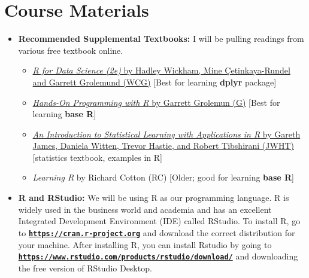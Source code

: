 \documentclass[11pt]{article}
\begin{document}
\section*{Course Materials}

\begin{itemize}

    \item \textbf{Recommended Supplemental Textbooks:} 
    I will be pulling readings from various free textbook online. 
    \begin{itemize}
        \item \href{https://r4ds.hadley.nz/}{\textit{R for Data Science (2e)} by Hadley Wickham, Mine \c{C}etinkaya-Rundel and Garrett Grolemund (WCG)} [Best for learning \textbf{dplyr} package]
        \item \href{https://rstudio-education.github.io/hopr/}{\textit{Hands-On Programming with R} by Garrett Grolemun (G)} [Best for learning \textbf{base R}]
        \item \href{https://web.stanford.edu/~hastie/ISLRv2_website.pdf}{\textit{An Introduction to Statistical Learning with Applications in R} by Gareth James, Daniela Witten, Trevor Hastie, and Robert Tibshirani (JWHT)} [statistics textbook, examples in R]
        \item \textit{Learning R} by Richard Cotton (RC) [Older; good for learning \textbf{base R}]
    \end{itemize}
    
    \item \textbf{R and RStudio:} We will be using R as our programming language. R is widely used in the business world and academia and has an excellent Integrated Development Environment (IDE) called RStudio. To install R, go to \href{https://cran.r-project.org}{\tt\bf https://cran.r-project.org} and download the correct distribution for your machine. After installing R, you can install Rstudio by going to \href{https://www.rstudio.com/products/rstudio/download/}{\tt\bf https://www.rstudio.com/products/rstudio/download/} and downloading the free version of RStudio Desktop.
    

\end{itemize}
\end{document}
